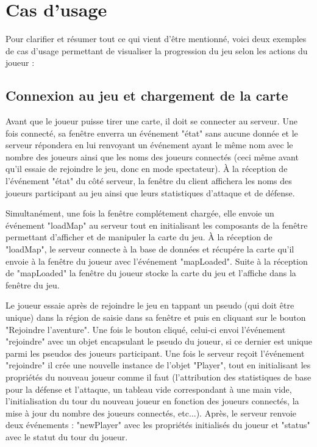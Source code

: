 \documentclass[12pt]{report}
\begin{document}
	\section{Cas d'usage}
	Pour clarifier et résumer tout ce qui vient d'être mentionné, voici deux exemples de cas d'usage permettant de visualiser la progression du jeu selon les actions du joueur :

	  	\subsection{Connexion au jeu et chargement de la carte}
			Avant que le joueur puisse tirer une carte, il doit se connecter au serveur. Une fois connecté, sa fenêtre enverra un événement "état" sans aucune donnée et le serveur répondera en lui renvoyant un événement ayant le même nom avec le nombre des joueurs ainsi que les noms des joueurs connectés (ceci même avant qu'il essaie de rejoindre le jeu, donc en mode spectateur). À la réception de l'événement "état" du côté serveur, la fenêtre du client affichera les noms des joueurs participant au jeu ainsi que leurs statistiques d'attaque et de défense.

			Simultanément, une fois la fenêtre complétement chargée, elle envoie un événement "loadMap" au serveur tout en initialisant les composants de la fenêtre permettant d'afficher et de manipuler la carte du jeu. À la réception de "loadMap", le serveur connecte à la base de données et récupére la carte qu'il envoie à la fenêtre du joueur avec l'événement "mapLoaded". Suite à la réception de "mapLoaded" la fenêtre du joueur stocke la carte du jeu et l'affiche dans la fenêtre du jeu.

			Le joueur essaie après de rejoindre le jeu en tappant un pseudo (qui doit être unique) dans la région de saisie dans sa fenêtre et puis en cliquant sur le bouton "Rejoindre l'aventure". Une fois le bouton cliqué, celui-ci envoi l'événement "rejoindre" avec un objet encapsulant le pseudo du joueur, si ce dernier est unique parmi les pseudos des joueurs participant. Une fois le serveur reçoit l'événement "rejoindre" il crée une nouvelle instance de l'objet "Player", tout en initialisant les propriétés du nouveau joueur comme il faut (l'attribution des statistiques de base pour la défense et l'attaque, un tableau vide correspondant à une main vide, l'initialisation du tour du nouveau joueur en fonction des joueurs connectés, la mise à jour du nombre des joueurs connectés, etc...). Après, le serveur renvoie deux événements : "newPlayer" avec les propriétés initialisés du joueur et "status" avec le statut du tour du joueur.
\end{document}

